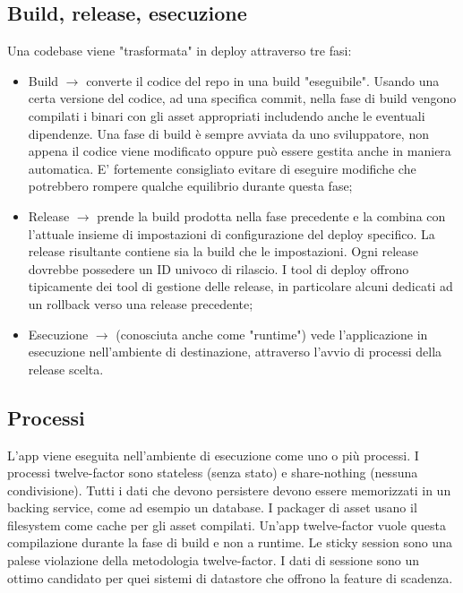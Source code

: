 \documentclass[PianoDiQualifica.tex]{subfiles}
\begin{document}
\subsection{Build, release, esecuzione}
Una codebase viene "trasformata" in deploy attraverso tre fasi:
\begin{itemize}
\item Build $\rightarrow$ converte il codice del repo in una build "eseguibile". Usando una certa versione del codice, ad una specifica commit, nella fase di build vengono compilati i binari con gli asset appropriati includendo anche le eventuali dipendenze. Una fase di build è sempre avviata da uno sviluppatore, non appena il codice viene modificato oppure può essere gestita anche in maniera automatica. E' fortemente consigliato evitare di eseguire modifiche che potrebbero rompere qualche equilibrio durante questa fase;
\item Release $\rightarrow$ prende la build prodotta nella fase precedente e la combina con l'attuale insieme di impostazioni di configurazione del deploy specifico. La release risultante contiene sia la build che le impostazioni. Ogni release dovrebbe possedere un ID univoco di rilascio. I tool di deploy offrono tipicamente dei tool di gestione delle release, in particolare alcuni dedicati ad un rollback verso una release precedente;
\item Esecuzione $\rightarrow$ (conosciuta anche come "runtime") vede l'applicazione in esecuzione nell'ambiente di destinazione, attraverso l'avvio di processi della release scelta.
\end{itemize}

\subsection{Processi}
L'app viene eseguita nell'ambiente di esecuzione come uno o più processi. I processi twelve-factor sono stateless (senza stato) e share-nothing (nessuna condivisione). Tutti i dati che devono persistere devono essere memorizzati in un backing service, come ad esempio un database.
I packager di asset usano il filesystem come cache per gli asset compilati. Un'app twelve-factor vuole questa compilazione durante la fase di build e non a runtime.
Le sticky session sono una palese violazione della metodologia twelve-factor. I dati di sessione sono un ottimo candidato per quei sistemi di datastore che offrono la feature di scadenza.
\end{document}
